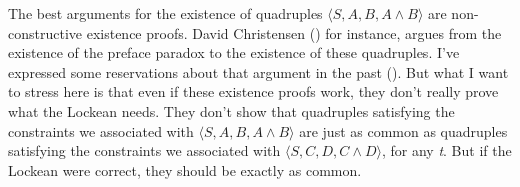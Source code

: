 \documentclass[
  11pt,
  letterpaper,
  DIV=11,
  numbers=noendperiod,
  twoside]{scrartcl}
\begin{document}
The best arguments for the existence of quadruples
\(\langle S, A, B, A \wedge B \rangle\) are non-constructive existence
proofs. David Christensen () for
instance, argues from the existence of the preface paradox to the
existence of these quadruples. I've expressed some reservations about
that argument in the past
(). But what I want
to stress here is that even if these existence proofs work, they don't
really prove what the Lockean needs. They don't show that quadruples
satisfying the constraints we associated with
\(\langle S, A, B, A \wedge B \rangle\) are just as common as quadruples
satisfying the constraints we associated with
\(\langle S, C, D, C \wedge D \rangle\), for any \emph{t}. But if the
Lockean were correct, they should be exactly as common.
\end{document}

